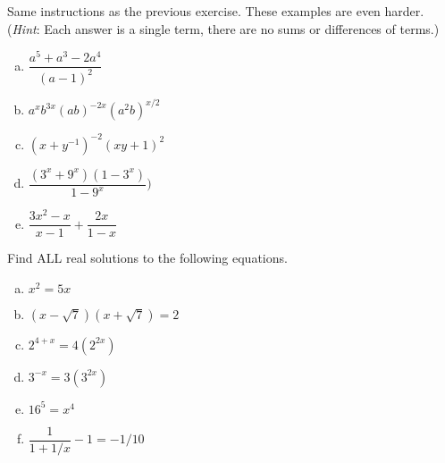 \begin{exercise}{9}
Same instructions as the previous exercise. These examples are even harder. (\emph{Hint}: Each answer is a single term, there are no sums or differences of terms.)
\begin{multicols}{2}
\begin{enumerate}[(a)]
\item
$\dfrac{a^5 +a^3 - 2a^4}{(a-1)^2}$
\item
$a^x b^{3x}(ab)^{-2x}(a^2 b)^{x/2}$
\item
$(x+y^{-1})^{-2}(xy+1)^2$
\item
$\dfrac{(3^x+9^x)(1-3^x)}{1-9^x})$
\item
$\dfrac{3x^2 - x}{x-1} + \dfrac{2x}{1-x}$

\end{enumerate}
\end{multicols}
\end{exercise}

\begin{exercise}{10}
Find ALL  real solutions to the following equations. 
\begin{multicols}{2}
\begin{enumerate}[(a)]
\item
$x^2 = 5x$
\item
$(x - \sqrt{7})(x+\sqrt{7}) = 2$
\item
$2^{4+x} = 4(2^{2x})$
\item
$3^{-x} = 3(3^{2x})$
\item
$16^5 = x^4$
\item
$\dfrac{1}{1 + 1/x} -1= -1/10$
\end{enumerate}
\end{multicols}
\end{exercise}
